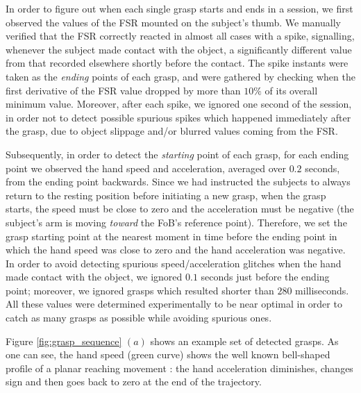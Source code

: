 In order to figure out when each single grasp starts and ends in a
session, we first observed the values of the FSR mounted on the
subject's thumb. We manually verified that the FSR correctly reacted
in almost all cases with a spike, signalling, whenever the subject
made contact with the object, a significantly different value from
that recorded elsewhere shortly before the contact. The spike instants
were taken as the \emph{ending} points of each grasp, and were
gathered by checking when the first derivative of the FSR value
dropped by more than $10\%$ of its overall minimum value. Moreover,
after each spike, we ignored one second of the session, in order not
to detect possible spurious spikes which happened immediately after
the grasp, due to object slippage and/or blurred values coming from
the FSR.

Subsequently, in order to detect the \emph{starting} point of each
grasp, for each ending point we observed the hand speed and
acceleration, averaged over $0.2$ seconds, from the ending point
backwards. Since we had instructed the subjects to always return to
the resting position before initiating a new grasp, when the grasp
starts, the speed must be close to zero and the acceleration must be
negative (the subject's arm is moving \emph{toward} the FoB's
reference point). Therefore, we set the grasp starting point at the
nearest moment in time before the ending point in which the hand speed
was close to zero and the hand acceleration was negative. In order to
avoid detecting spurious speed/acceleration glitches when the hand
made contact with the object, we ignored $0.1$ seconds just before the
ending point; moreover, we ignored grasps which resulted shorter than
$280$ milliseconds. All these values were determined experimentally to
be near optimal in order to catch as many grasps as possible while
avoiding spurious ones.

Figure \ref{fig:grasp_sequence} $(a)$ shows an example set of detected
grasps. As one can see, the hand speed (green curve) shows the well
known bell-shaped profile of a planar reaching movement \cite{morasso-81}: 
the hand acceleration diminishes, changes sign and then goes back to zero at 
the end of the trajectory.

